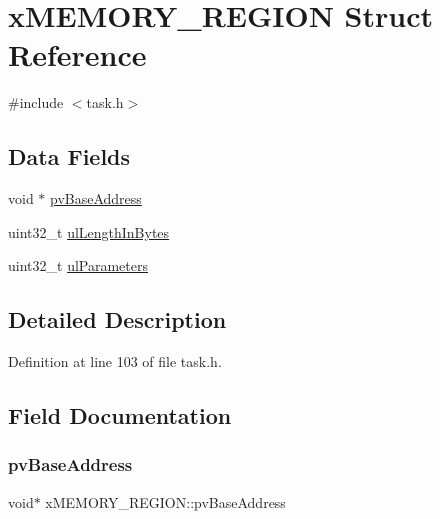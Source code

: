 \hypertarget{structx_m_e_m_o_r_y___r_e_g_i_o_n}{}\section{x\+M\+E\+M\+O\+R\+Y\+\_\+\+R\+E\+G\+I\+ON Struct Reference}
\label{structx_m_e_m_o_r_y___r_e_g_i_o_n}


{\ttfamily \#include $<$task.\+h$>$}

\subsection*{Data Fields}
\begin{DoxyCompactItemize}
\item 
void $\ast$ \hyperlink{structx_m_e_m_o_r_y___r_e_g_i_o_n_a228036bbfdbc38f170e45deadb166172}{pv\+Base\+Address}
\item 
uint32\+\_\+t \hyperlink{structx_m_e_m_o_r_y___r_e_g_i_o_n_a97e59578d3c4c46270d33e7206258a65}{ul\+Length\+In\+Bytes}
\item 
uint32\+\_\+t \hyperlink{structx_m_e_m_o_r_y___r_e_g_i_o_n_a6ba180553e9a318f23acc5f4664934e3}{ul\+Parameters}
\end{DoxyCompactItemize}


\subsection{Detailed Description}


Definition at line 103 of file task.\+h.



\subsection{Field Documentation}
\mbox{\label{structx_m_e_m_o_r_y___r_e_g_i_o_n_a228036bbfdbc38f170e45deadb166172}} 
\subsubsection{\texorpdfstring{pv\+Base\+Address}{pvBaseAddress}}
{\footnotesize\ttfamily void$\ast$ x\+M\+E\+M\+O\+R\+Y\+\_\+\+R\+E\+G\+I\+O\+N\+::pv\+Base\+Address}



